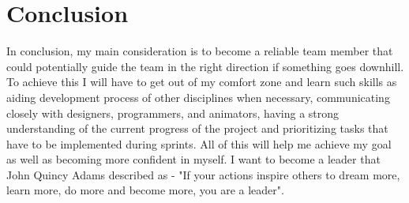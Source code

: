 \documentclass{scrartcl}
\begin{document}
\section{Conclusion}
In conclusion, my main consideration is to become a reliable team member that could potentially guide the team in the right direction if something goes downhill. To achieve this I will have to get out of my comfort zone and learn such skills as aiding development process of other disciplines when necessary, communicating closely with designers, programmers, and animators, having a strong understanding of the current progress of the project and prioritizing tasks that have to be implemented during sprints. All of this will help me achieve my goal as well as becoming more confident in myself. I want to become a leader that John Quincy Adams described as - "If your actions inspire others to dream more, learn more, do more and become more, you are a leader".



\nocite{*}
\end{document}
